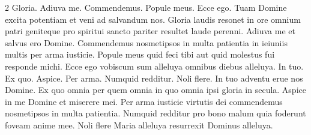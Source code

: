 \begin{multicols*}{2}
 Gloria.
 Adiuva me.
 Commendemus.
 Popule meus.
 Ecce ego.
 Tuam Domine excita potentiam et veni ad salvandum nos.
 Gloria laudis resonet in ore omnium patri geniteque pro spiritui sancto pariter resultet laude perenni.
 Adiuva me et salvus ero Domine.
 Commendemus nosmetipsos in multa patientia in ieiuniis multis per arma iusticie.
 Popule meus quid feci tibi aut quid molestus fui responde michi.
 Ecce ego vobiscum sum alleluya omnibus diebus alleluya.
 In tuo.
 Ex quo.
 Aspice.
 Per arma.
 Numquid redditur.
 Noli flere.
 In tuo adventu erue nos Domine.
 Ex quo omnia per quem omnia in quo omnia ipsi gloria in secula.
 Aspice in me Domine et miserere mei.
 Per arma iusticie virtutis dei commendemus nosmetipsos in multa patientia.
 Numquid redditur pro bono malum quia foderunt foveam anime mee.
 Noli flere Maria alleluya resurrexit Dominus alleluya.

\end{multicols*}
